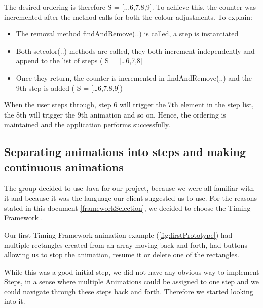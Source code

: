 \documentclass{l3proj}
\begin{document}
The desired ordering is therefore S  = [...6,7,8,9]. To achieve this, the counter was incremented after the method calls for both the colour adjustments. To explain:
\begin{itemize}
\item The removal method findAndRemove(..) is called, a step is instantiated
\item Both setcolor(..) methods are called, they both increment independently and append to the list of steps ( S = […6,7,8]
\item Once they return, the counter is incremented in findAndRemove(..) and the 9th step is added ( S = […6,7,8,9])
\end{itemize}

When the user steps through, step 6 will trigger the 7th element in the step list, the 8th will trigger the 9th animation and so on. Hence, the ordering is maintained and the application performs successfully.

\subsection{Separating animations into steps and making continuous animations}
\label{PE:steps}

The group decided to use Java for our project, because we were all familiar with it and because it was the language our client suggested us to use. For the reasons stated in this document \ref{frameworkSelection}, we decided to choose the Timing Framework \cite{website:TimingFramework}.

Our first Timing Framework animation example (\ref{fig:firstPrototype}) had multiple rectangles created from an array moving back and forth, had buttons allowing us to stop the animation, resume it or delete one of the rectangles.



While this was a good initial step, we did not have any obvious way to implement Steps, in a sense where multiple Animations could be assigned to one step and we could navigate through these steps back and forth. Therefore we started looking into it.


\end{document}
